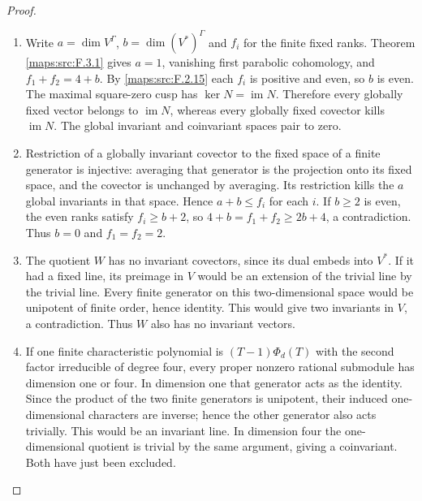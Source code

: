 \documentclass[11pt,a4paper]{article}
\theoremstyle{definition}
\begin{document}
\begin{proof}
\begin{enumerate}[label=\arabic*.]
\item Write $a=\dim V^\Gamma$, $b=\dim(V^*)^\Gamma$ and $f_i$
for the finite fixed ranks.  Theorem \ref{maps:src:F.3.1} gives $a=1$,
vanishing first parabolic cohomology, and
$f_1+f_2=4+b$.  By \ref{maps:src:F.2.15} each $f_i$ is positive and even, so $b$ is
even.  The maximal square-zero cusp has
$\ker N=\operatorname{im}N$.  Therefore every globally
fixed vector belongs to $\operatorname{im}N$, whereas every
globally fixed covector kills $\operatorname{im}N$.
The global invariant and coinvariant spaces pair to zero.

\item Restriction of a globally invariant covector to the fixed
space of a finite generator is injective: averaging that
generator is the projection onto its fixed space, and the
covector is unchanged by averaging.  Its restriction kills
the $a$ global invariants in that space.  Hence
$a+b\leq f_i$ for each $i$.
If $b\geq2$ is even, the even ranks satisfy
$f_i\geq b+2$, so $4+b=f_1+f_2\geq2b+4$, a contradiction.
Thus $b=0$ and $f_1=f_2=2$.

\item The quotient $W$ has no invariant covectors, since its dual
embeds into $V^*$.  If it had a fixed line, its preimage in
$V$ would be an extension of the trivial line by the trivial
line.  Every finite generator on this two-dimensional
space would be unipotent of finite order, hence identity.
This would give two invariants in $V$, a contradiction.
Thus $W$ also has no invariant vectors.

\item If one finite characteristic polynomial is
$(T-1)\Phi_d(T)$ with the second factor irreducible of degree
four, every proper nonzero rational submodule has dimension
one or four.  In dimension one that generator acts as the
identity.  Since the product of the two finite generators
is unipotent, their induced one-dimensional characters are
inverse; hence the other generator also acts trivially.
This would be an invariant line.  In dimension four the
one-dimensional quotient is trivial by the same argument,
giving a coinvariant.  Both have just been excluded.

\end{enumerate}
\end{proof}
\end{document}
